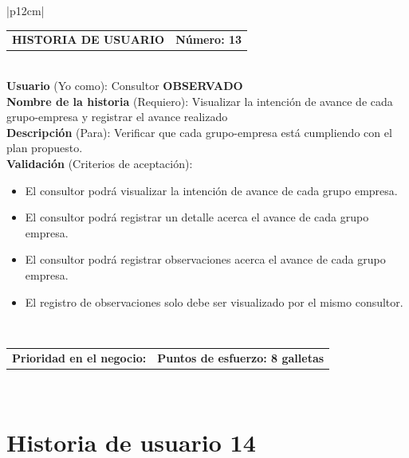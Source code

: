 \documentclass[11pt,letterpaper]{report}
\begin{document}
	\begin{center}	
		\begin{tabular}{|p{12cm}|}
			\hline
			\begin{tabular}{c|c}
				\textbf{HISTORIA DE USUARIO} & \textbf{Número: 13} \\
			\end{tabular} \\ \hline
			\textbf{Usuario} (Yo como): Consultor \textbf{OBSERVADO}\\ \hline
			\textbf{Nombre de la historia} (Requiero): Visualizar la intención de avance de cada grupo-empresa y registrar el avance realizado \\ \hline
			\textbf{Descripción} (Para): Verificar que cada grupo-empresa está cumpliendo con el plan propuesto. \\ \hline
			\textbf{Validación} (Criterios de aceptación): \\
			\begin{minipage}{12cm}
				\begin{itemize}
					\item El consultor podrá visualizar la intención de avance de cada grupo empresa.
					\item El consultor podrá registrar un detalle acerca el avance de cada grupo empresa.
					\item El consultor podrá registrar observaciones acerca el avance de cada grupo empresa.
					\item El registro de observaciones solo debe ser visualizado por el mismo consultor.
				\end{itemize}
			\end{minipage} \\ \hline
			\begin{tabular}{p{6cm}|c}
				\textbf{Prioridad en el negocio: } & \textbf{Puntos de esfuerzo: 8 galletas} \\
			\end{tabular} \\ \hline
		\end{tabular}
	\end{center}
	
	\section{Historia de usuario 14}
	
\end{document}
